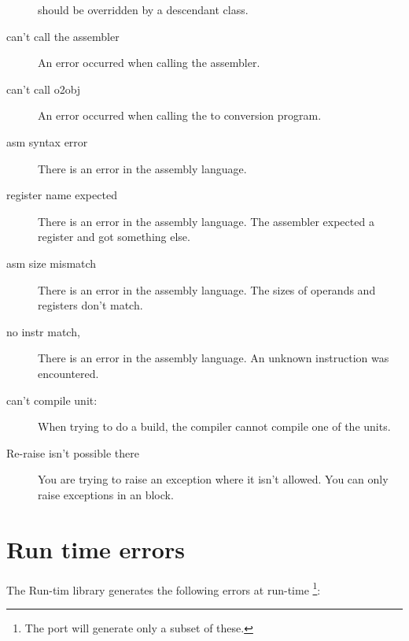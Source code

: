 \documentclass{report}
\begin{document}
\begin{description}
should be overridden by a descendant class.
\item [can't call the assembler]
An error occurred when calling the assembler.
\item [can't call o2obj]
An error occurred when calling the  to  conversion program.
\item [asm syntax error]
There is an error in the assembly language.
\item [register name expected]
There is an error in the assembly language. The assembler expected a
register and got something else.
\item [asm size mismatch]
There is an error in the assembly language. The sizes of operands and
registers don't match.
\item [no instr match,]
There is an error in the assembly language. An unknown instruction was
encountered.
\item [can't compile unit:]
When trying to do a build, the compiler cannot compile one of the units.
\item [Re-raise isn't possible there]
You are trying to raise an exception where it isn't allowed. You can only
raise exceptions in an  block.
\end{description}

\chapter{Run time errors}
The \fpc Run-tim library generates the following errors at run-time
\footnote{The \linux port will generate only a subset of these.}:
\end{document}
